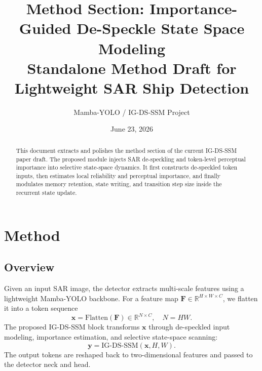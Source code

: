 \documentclass[10pt]{article}
\title{\vspace{-1.2em}Method Section: Importance-Guided De-Speckle State Space Modeling\\
\large Standalone Method Draft for Lightweight SAR Ship Detection}
\author{Mamba-YOLO / IG-DS-SSM Project}
\date{June 23, 2026}
\begin{document}
\maketitle
\vspace{-1.0em}

\begin{abstract}
This document extracts and polishes the method section of the current IG-DS-SSM paper draft. The proposed module injects SAR de-speckling and token-level perceptual importance into selective state-space dynamics. It first constructs de-speckled token inputs, then estimates local reliability and perceptual importance, and finally modulates memory retention, state writing, and transition step size inside the recurrent state update.
\end{abstract}

\section{Method}

\subsection{Overview}

Given an input SAR image, the detector extracts multi-scale features using a lightweight Mamba-YOLO backbone. For a feature map $\mathbf{F}\in\mathbb{R}^{H\times W\times C}$, we flatten it into a token sequence
\begin{equation}
  \mathbf{x}=\mathrm{Flatten}(\mathbf{F})\in\mathbb{R}^{N\times C}, \quad N=HW.
\end{equation}
The proposed IG-DS-SSM block transforms $\mathbf{x}$ through de-speckled input modeling, importance estimation, and selective state-space scanning:
\begin{equation}
  \mathbf{y}=\mathrm{IG\mbox{-}DS\mbox{-}SSM}(\mathbf{x}, H, W).
\end{equation}
The output tokens are reshaped back to two-dimensional features and passed to the detector neck and head.
\end{document}
